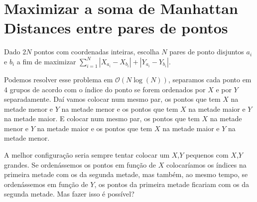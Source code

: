 
\section{Maximizar a soma de Manhattan Distances entre pares de pontos}
Dado $2N$ pontos com coordenadas inteiras, escolha $N$ pares de ponto disjuntos $a_i$ e $b_i$ a fim de maximizar $\sum_{i=1}^N|X_{a_i} - X_{b_i}| + |Y_{a_i} - Y_{b_i}|$.

Podemos resolver esse problema em $\mathcal{O}(N\log(N))$, separamos cada ponto em 4 grupos de acordo com o índice do ponto se forem ordenados por $X$ e por $Y$ separadamente. Daí vamos colocar num mesmo par, os pontos que tem $X$ na metade menor e $Y$ na metade menor e os pontos que tem $X$ na metade maior e $Y$ na metade maior. E colocar num mesmo par, os pontos que tem $X$ na metade menor e $Y$ na metade maior e os pontos que tem $X$ na metade maior e $Y$ na metade menor.

A melhor configuração seria sempre tentar colocar um $X$,$Y$ pequenos com $X$,$Y$ grandes. Se ordenássemos os pontos em função de $X$ colocaríamos os índices na primeira metade com os da segunda metade, mas também, ao mesmo tempo, se ordenássemos em função de $Y$, os pontos da primeira metade ficariam com os da segunda metade. Mas fazer isso é possível?

